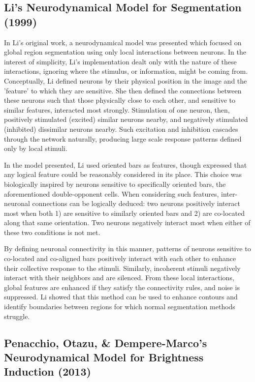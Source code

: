 \documentclass[journal,onecolumn]{IEEEtran}
\begin{document}
\subsection*{Li's Neurodynamical Model for Segmentation (1999)}
In Li's original work, a neurodynamical model was presented which focused on global region segmentation using only local interactions between neurons. In the interest of simplicity, Li's implementation dealt only with the nature of these interactions, ignoring where the stimulus, or information, might be coming from. Conceptually, Li defined neurons by their physical position in the image and the 'feature' to which they are sensitive. She then defined the connections between these neurons such that those physically close to each other, and sensitive to similar features, interacted most strongly. Stimulation of one neuron, then, positively stimulated (excited) similar neurons nearby, and negatively stimulated (inhibited) dissimilar neurons nearby. Such excitation and inhibition cascades through the network naturally, producing large scale response patterns defined only by local stimuli.

In the model presented, Li used oriented bars as features, though expressed that any logical feature could be reasonably considered in its place. This choice was biologically inspired by neurons sensitive to specifically oriented bars, the aforementioned double-opponent cells. When considering such features, inter-neuronal connections can be logically deduced: two neurons positively interact most when both 1) are sensitive to similarly oriented bars and 2) are co-located along that same orientation. Two neurons negatively interact most when either of these two conditions is not met.

By defining neuronal connectivity in this manner, patterns of neurons sensitive to co-located and co-aligned bars positively interact with each other to enhance their collective response to the stimuli. Similarly, incoherent stimuli negatively interact with their neighbors and are silenced. From these local interactions, global features are enhanced if they satisfy the connectivity rules, and noise is suppressed. Li showed that this method can be used to enhance contours and identify boundaries between regions for which normal segmentation methods struggle.


\subsection*{Penacchio, Otazu, \& Dempere-Marco's Neurodynamical Model for Brightness Induction (2013)}
\end{document}
